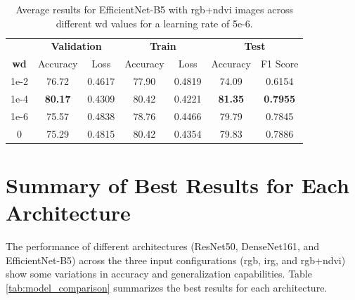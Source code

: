 \begin{table}[h]
    \centering
    \renewcommand{\arraystretch}{1.3}
    \setlength{\tabcolsep}{8pt}
    \begin{tabular}{|c|cccccc|}
        \hline
        & \multicolumn{2}{c}{\textbf{Validation}} & \multicolumn{2}{c}{\textbf{Train}} & \multicolumn{2}{c|}{\textbf{Test}} \\
        \textbf{\gls{wd}} & Accuracy & Loss & Accuracy & Loss & Accuracy & F1 Score \\
        \hline
        1e-2  & 76.72  & 0.4617  & 77.90  & 0.4819  & 74.09  & 0.6154 \\
        1e-4  & \textbf{80.17}  & 0.4309   & 80.42  & 0.4221  & \textbf{81.35}  & \textbf{0.7955} \\
        1e-6  & 75.57  & 0.4838  & 78.76  & 0.4466  & 79.79  & 0.7845 \\
        0     & 75.29 & 0.4815 & 80.42 & 0.4354 & 79.83 & 0.7886 \\
        \hline
    \end{tabular}
    \caption{Average results for EfficientNet-B5 with \gls{rgb}+\gls{ndvi} images across different \gls{wd} values for a learning rate of 5e-6.}
    \label{tab:efficientnetb5_wd_rgb_ndvi}
\end{table}

\section{Summary of Best Results for Each Architecture}

The performance of different architectures (ResNet50, DenseNet161, and EfficientNet-B5) 
across the three input configurations (\gls{rgb}, \gls{irg}, and \gls{rgb}+\gls{ndvi}) show some variations 
in accuracy and generalization capabilities. Table \ref{tab:model_comparison} summarizes the best 
results for each architecture.


